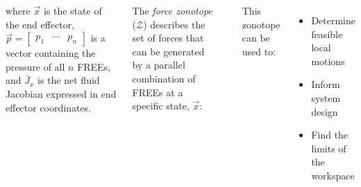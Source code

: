 \documentclass[25pt, a0paper, portrait]{tikzposter}
\newcommand{\mtx}[1]{\begin{bmatrix} #1 \end{bmatrix}}
\begin{document}
\begin{columns}
{{\begin{minipage}[c]{0.65\linewidth}
        where $\vec{x}$ is the state of the end effector, $\vec{p} = \mtx{p_1 & \cdots & p_n}$ is a vector containing the pressure of all $n$ FREEs, and $\bar{J}_x$ is the net fluid Jacobian expressed in end effector coordinates.
    \end{minipage}
    
    \begin{minipage}[c]{0.55\linewidth}
        The \emph{force zonotope} ($\mathcal{Z}$) describes the set of forces that can be generated by a parallel combination of FREEs at a specific state, $\vec{x}$:
        
        \vspace{18pt}
        \begin{centering}
        \end{centering}
        
        This zonotope can be used to:
        \begin{itemize}
            \setlength{\itemindent}{1in}
            \item Determine feasible local motions
            \item Inform system design
            \item Find the limits of the workspace
        \end{itemize}
    \end{minipage}
    \hspace{12pt}
    \begin{minipage}[c]{0.4\linewidth}
        \centering
        
    \end{minipage}
    }
}



\end{columns}
\end{document}
